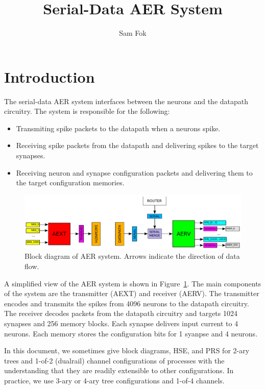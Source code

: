 \documentclass{article}
\begin{document}
\title{Serial-Data AER System}
\author{Sam Fok}
\maketitle

\tableofcontents

\section{Introduction}

The serial-data AER system interfaces between the neurons and the datapath
circuitry. The system is responsible for the following:
\begin{itemize}
    \item Transmiting spike packets to the datapath when a neurons spike. 
    \item Receiving spike packets from the datapath and delivering spikes
          to the target synapses.
    \item Receiving neuron and synapse configuration packets and delivering
          them to the target configuration memories.
\end{itemize}

\begin{figure}
    \centering
    \includegraphics[width=.95\textwidth]{img/aer_system.pdf}
    \caption{Block diagram of AER system. Arrows indicate the direction of data flow.}
    \label{fig:aer_system}
\end{figure}

A simplified view of the AER system is shown in Figure~\ref{fig:aer_system}.
The main components of the system are the transmitter (AEXT) and receiver (AERV).
The transmitter encodes and transmits the spikes from 4096 neurons to the datapath circuitry.
The receiver decodes packets from the datapath circuitry and targets 1024 synapses and 256 memory blocks.
Each synapse delivers input current to 4 neurons. 
Each memory stores the configuration bits for 1 syanpse and 4 neurons.

In this document, we sometimes give block diagrams, HSE, and PRS for 2-ary trees and 
1-of-2 (dualrail) channel configurations of processes with the understanding that they 
are readily extensible to other configurations.
In practice, we use 3-ary or 4-ary tree configurations and 1-of-4 channels.
\end{document}
